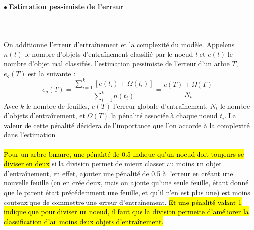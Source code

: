 \documentclass[letterpaper, 12pt]{article}
\newcommand{\point}{$\bullet\ $}
\begin{document}
			\paragraph{\point Estimation pessimiste de l'erreur}~\\~\\
				On additionne
				l'erreur d'entraînement et la complexité du modèle. 
				Appelons $n(t)$ le nombre d'objets d'entraînement classifié 
				par le noeud $t$ et $e(t)$ le nombre d'objet mal classifiés.
				l'estimation pessimiste de l'erreur d'un arbre $T$, $e_g(T)$
				est la suivante :
				$$ e_g(T) = \frac{\sum_{i=1}^{k}[e(t_i) + \Omega(t_i)]}%
				                 {\sum_{i=1}^{k}n(t_i)}
				          = \frac{e(T) + \Omega(T)}{N_t} $$
				Avec $k$ le nombre de feuilles, $e(T)$ 
				l'erreur globale d'entraînement, $N_t$ le nombre d'objets
				d'entraînement, et $\Omega(T)$ la pénalité associée à 
				chaque noeud $t_i$. La valeur de cette pénalité décidera
				de l'importance que l'on accorde à la complexité dans 
				l'estimation. \\
				~\\				
				\hl{Pour un arbre binaire, une pénalité de 0.5
				indique qu'un noeud doit toujours se diviser en deux}
				si la division permet de mieux classer au moins un objet 
				d'entraînement, en effet, ajouter une pénalité de 0.5
				à l'erreur en créant une nouvelle feuille 
				(on en crée deux, mais
				on ajoute qu'une seule feuille, étant donné que le parent 
				était précédemment une feuille, et qu'il n'en est plus une)
				est moins couteux que de commettre une erreur d'entraînement.
				\hl{Et une pénalité valant 1 indique que pour diviser un noeud,
				il faut que la division permette d'améliorer 
				la classification d'au moins deux objets d'entraînement.}
\end{document}
